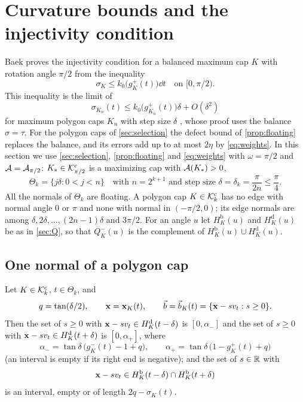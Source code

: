\section{Curvature bounds and the injectivity condition}\label{sec:injectivity}

Baek proves the injectivity condition for a balanced maximum cap $K$ with
rotation angle $\pi/2$ from the inequality 
\[
  \sigma_K\le k_0\bigl(g_K^+(t)\bigr)\dd t\quad\text{on }[0,\pi/2).
\]
This inequality is the limit of
\[
  \sigma_{K_n}(t)\le k_0\bigl(g_{K_n}^+(t)\bigr)\delta+O(\delta^2)
\]
for maximum polygon caps $K_n$ with step size $\delta$ , whose
proof uses the balance $\sigma=\tau$. For the polygon caps of
\cref{sec:selection} the defect bound of \cref{prop:floating} replaces the
balance, and its errors add up to at most $2\eta$ by \eqref{eq:weights}. In
this section we use \cref{sec:selection}, \cref{prop:floating} and
\eqref{eq:weights} with $\omega=\pi/2$ and $\mathcal{A}=\mathcal{A}_{\pi/2}$:
$K_*\in\mathcal{K}^{\mathrm{c}}_{\pi/2}$ is a maximizing cap with $\mathcal{A}(K_*)>0$,
\[
  \Theta_k=\{j\delta:0<j<n\}\quad\text{with }n=2^{k+1}\text{ and step size }
  \delta=\delta_k=\frac\pi{2n}\le\frac\pi4.
\]
All the normals of $\Theta_k$ are floating. A polygon cap $K\in\mathcal{K}^{\mathrm{c}}_k$ has no
edge with normal angle $0$ or $\pi$ and none with normal in $(-\pi/2,0)$; its
edge normals are among $\delta,2\delta,\dots,(2n-1)\delta$ and $3\pi/2$. For an
angle $u$ let $H^{\mathrm b}_K(u)$ and $H^{\mathrm d}_K(u)$ be as in
\cref{sec:Q}, so that $Q^-_K(u)$ is the complement of
$H^{\mathrm b}_K(u)\cup H^{\mathrm d}_K(u)$.

\subsection{One normal of a polygon cap}

\begin{lemma}\label{lem:wall}
Let $K\in\mathcal{K}^{\mathrm{c}}_k$, $t\in\Theta_k$, and
\[
  q=\tan(\delta/2),\qquad\mathbf{x}=\mathbf{x}_K(t),\qquad
  \vec b=\vec b_K(t)=\{\mathbf{x}-sv_t:s\ge0\}.
\]
Then the set of $s\ge0$ with $\mathbf{x}-sv_t\in H^{\mathrm d}_K(t-\delta)$ is
$[0,\alpha_-]$ and the set of $s\ge0$ with
$\mathbf{x}-sv_t\in H^{\mathrm d}_K(t+\delta)$ is $[0,\alpha_+]$, where
\[
  \alpha_-=\tan\delta\,\bigl(g_K^-(t)-1+q\bigr),\qquad\alpha_+
    =\tan\delta\,\bigl(1-g_K^+(t)+q\bigr)
\]
(an interval is empty if its right end is negative); and the set of $s\in\mathbb{R}$
with
\[
  \mathbf{x}-sv_t\in H^{\mathrm b}_K(t-\delta)\cap H^{\mathrm b}_K(t+\delta)
\]
is an interval, empty or of length $2q-\sigma_K(t)$.
\end{lemma}

